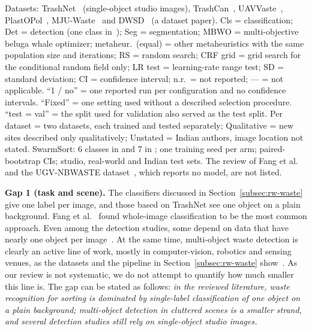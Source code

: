 \begin{table}[!t]
\vspace{3pt}
\begin{minipage}{\textwidth}
\scriptsize
Datasets: TrashNet~\cite{yang2016classification} (single-object studio images), TrashCan~\cite{hong2020trashcan}, UAVVaste~\cite{kraft2021autonomous}, PlastOPol~\cite{cordova2022litter}, MJU-Waste~\cite{wang2020multilevel} and DWSD~\cite{ali2025dwsd} (a dataset paper). Cls = classification; Det = detection (one class in~\cite{majchrowska2022deep,cordova2022litter}); Seg = segmentation; MBWO = multi-objective beluga whale optimizer; metaheur.\ (equal) = other metaheuristics with the same population size and iterations; RS = random search; CRF grid = grid search for the conditional random field only; LR test = learning-rate range test; SD = standard deviation; CI = confidence interval; n.r.\ = not reported; --- = not applicable. ``1 / no'' = one reported run per configuration and no confidence intervals. ``Fixed'' = one setting used without a described selection procedure. ``test = val'' = the split used for validation also served as the test split. Per dataset = two datasets, each trained and tested separately; Qualitative = new sites described only qualitatively; Unstated = Indian authors, image location not stated. SwarmSort: 6 classes in \genone and 7 in \gentwo; one training seed per arm; paired-bootstrap CIs; studio, real-world and Indian test sets. The review of Fang et al.~\cite{fang2023artificial} and the UGV-NBWASTE dataset~\cite{isalm2025ugvnbwaste}, which reports no model, are not listed.
\end{minipage}
\end{table}

\textbf{Gap 1 (task and scene).} The classifiers discussed in Section~\ref{subsec:rw-waste}~\cite{yang2016classification,kaya2023classification,sayed2024intelligent,alshammari2025smart,kumsetty2022trashbox} give one label per image, and those based on TrashNet see one object on a plain background. Fang et al.~\cite{fang2023artificial} found whole-image classification to be the most common approach. Even among the detection studies, some depend on data that have nearly one object per image~\cite{melinte2020deep,kumar2021novel,isalm2025ugvnbwaste}. At the same time, multi-object waste detection is clearly an active line of work, mostly in computer-vision, robotics and sensing venues, as the datasets and the pipeline in Section~\ref{subsec:rw-waste} show~\cite{proenca2020taco,bashkirova2022zerowaste,cheng2021flow,yudin2024hierarchical,kraft2021autonomous,cordova2022litter,hong2020trashcan,majchrowska2022deep}. As our review is not systematic, we do not attempt to quantify how much smaller this line is. The gap can be stated as follows: \emph{in the reviewed literature, waste recognition for sorting is dominated by single-label classification of one object on a plain background; multi-object detection in cluttered scenes is a smaller strand, and several detection studies still rely on single-object studio images.}

